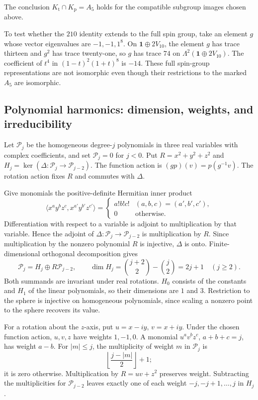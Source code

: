 \documentclass[11pt,a4paper]{article}
\begin{document}
The conclusion \(K_{\mathrm t}\cap K_{\mathrm p}=A_5\) holds for the compatible subgroup images chosen above.

To test whether the \(210\) identity extends to the full spin group, take an element \(g\) whose vector eigenvalues are \(-1,-1,1^8\). On \(\mathbf1\oplus2V_{10}\), the element \(g\) has trace thirteen and \(g^2\) has trace twenty-one, so \(g\) has trace \(74\) on \(\Lambda^2(\mathbf1\oplus2V_{10})\). The coefficient of \(t^4\) in \((1-t)^2(1+t)^8\) is \(-14\). These full spin-group representations are not isomorphic even though their restrictions to the marked \(A_5\) are isomorphic.

\subsection{Polynomial harmonics: dimension, weights, and irreducibility}\label{subsec:D5}
Let \(\mathcal P_j\) be the homogeneous degree-\(j\) polynomials in three real variables with complex coefficients, and set \(\mathcal P_j=0\) for \(j<0\). Put \(R=x^2+y^2+z^2\) and \(H_j=\ker(\Delta:\mathcal P_j\to\mathcal P_{j-2})\). The function action is \((gp)(v)=p(g^{-1}v)\). The rotation action fixes \(R\) and commutes with \(\Delta\).

Give monomials the positive-definite Hermitian inner product
\[
\langle x^ay^bz^c,x^{a'}y^{b'}z^{c'}\rangle
=\begin{cases}a!b!c!&(a,b,c)=(a',b',c'),\\0&\text{otherwise}.\end{cases}
\]
Differentiation with respect to a variable is adjoint to multiplication by that variable. Hence the adjoint of \(\Delta:\mathcal P_j\to\mathcal P_{j-2}\) is multiplication by \(R\). Since multiplication by the nonzero polynomial \(R\) is injective, \(\Delta\) is onto. Finite-dimensional orthogonal decomposition gives
\[
\mathcal P_j=H_j\oplus R\mathcal P_{j-2},\qquad
\dim H_j=\binom{j+2}{2}-\binom j2=2j+1
\quad(j\geq2).
\]
Both summands are invariant under real rotations. \(H_0\) consists of the constants and \(H_1\) of the linear polynomials, so their dimensions are \(1\) and \(3\). Restriction to the sphere is injective on homogeneous polynomials, since scaling a nonzero point to the sphere recovers its value.

For a rotation about the \(z\)-axis, put \(u=x-iy\), \(v=x+iy\). Under the chosen function action, \(u,v,z\) have weights \(1,-1,0\). A monomial \(u^av^bz^c\), \(a+b+c=j\), has weight \(a-b\). For \(|m|\leq j\), the multiplicity of weight \(m\) in \(\mathcal P_j\) is
\[
\left\lfloor\frac{j-|m|}{2}\right\rfloor+1;
\]
it is zero otherwise. Multiplication by \(R=uv+z^2\) preserves weight. Subtracting the multiplicities for \(\mathcal P_{j-2}\) leaves exactly one of each weight \(-j,-j+1,\ldots,j\) in \(H_j\).
\end{document}
